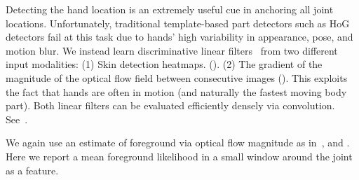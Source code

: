   Detecting the hand 
location is an extremely useful cue in anchoring all joint locations.  
Unfortunately, traditional template-based part detectors such as HoG detectors 
fail at this task due to hands' high variability in appearance, pose, and 
motion blur.  We instead learn discriminative linear filters~\citep{liblinear} 
from two different input modalities:  (1) Skin detection heatmaps.  
().  (2) The gradient of the magnitude of the optical flow field 
between consecutive images ().  This exploits the fact that 
hands are often in motion (and naturally the fastest moving body part).  Both 
linear filters can be evaluated efficiently densely via convolution.  
See~.

We again use an estimate of foreground via optical flow magnitude as 
in~, and .  Here we report a mean 
foreground likelihood in a small window around the joint as a feature.
